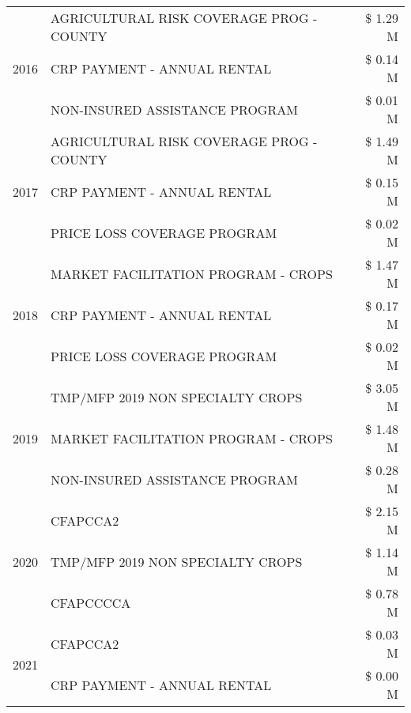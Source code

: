 \begin{tabular}{llr}
\cline{1-3}
\multirow[t]{3}{*}{2016} & AGRICULTURAL RISK COVERAGE PROG - COUNTY & \$ 1.29 M \\
 & CRP PAYMENT - ANNUAL RENTAL & \$ 0.14 M \\
 & NON-INSURED ASSISTANCE PROGRAM & \$ 0.01 M \\
\cline{1-3}
\multirow[t]{3}{*}{2017} & AGRICULTURAL RISK COVERAGE PROG - COUNTY & \$ 1.49 M \\
 & CRP PAYMENT - ANNUAL RENTAL & \$ 0.15 M \\
 & PRICE LOSS COVERAGE PROGRAM & \$ 0.02 M \\
\cline{1-3}
\multirow[t]{3}{*}{2018} & MARKET FACILITATION PROGRAM - CROPS & \$ 1.47 M \\
 & CRP PAYMENT - ANNUAL RENTAL & \$ 0.17 M \\
 & PRICE LOSS COVERAGE PROGRAM & \$ 0.02 M \\
\cline{1-3}
\multirow[t]{3}{*}{2019} & TMP/MFP 2019 NON SPECIALTY CROPS & \$ 3.05 M \\
 & MARKET FACILITATION PROGRAM - CROPS & \$ 1.48 M \\
 & NON-INSURED ASSISTANCE PROGRAM & \$ 0.28 M \\
\cline{1-3}
\multirow[t]{3}{*}{2020} & CFAPCCA2 & \$ 2.15 M \\
 & TMP/MFP 2019 NON SPECIALTY CROPS & \$ 1.14 M \\
 & CFAPCCCCA & \$ 0.78 M \\
\cline{1-3}
\multirow[t]{2}{*}{2021} & CFAPCCA2 & \$ 0.03 M \\
 & CRP PAYMENT - ANNUAL RENTAL & \$ 0.00 M \\
\cline{1-3}
\bottomrule
\end{tabular}
